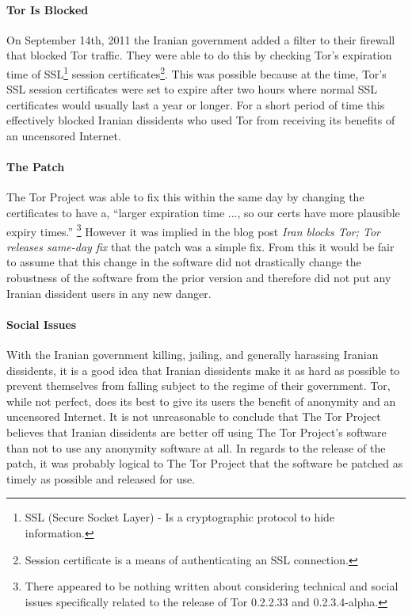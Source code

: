 \documentclass[11pt]{article}
\begin{document}
\begin{multicols}{2}
\paragraph{Tor Is Blocked}

On September 14th, 2011 the Iranian government added a filter to their firewall
that blocked Tor traffic. They were able to do this by checking Tor's expiration
time of SSL\footnote{SSL (Secure Socket Layer) - Is a cryptographic protocol to
hide information.} session certificates\footnote{Session certificate is a
means of authenticating an SSL connection.}. This was possible because at the
time, Tor's SSL session certificates were set to expire after two hours where normal SSL
certificates would usually last a year or longer. For a short period of time this
effectively blocked Iranian dissidents who used Tor from receiving its benefits
of an uncensored Internet.\cite{IranBlocksTorSameDayFix}

\paragraph{The Patch} 

The Tor Project was able to fix this within the same day by changing the
certificates to have a, ``larger expiration time ..., so our certs have more
plausible expiry times.''\cite{IranBlocksTorSameDayFix} \footnote{There appeared to be
nothing written about considering technical and social issues specifically
related to the release of Tor 0.2.2.33 and 0.2.3.4-alpha.}  However it was
implied in the blog post \textit{Iran blocks Tor; Tor releases same-day fix}
that the patch was a simple fix.\cite{IranBlocksTorSameDayFix} From this it
would be fair to assume that this change in the software did not drastically
change the robustness of the software from the prior version and therefore did
not put any Iranian dissident users in any new danger.

\paragraph{Social Issues}

With the Iranian government killing, jailing, and generally harassing Iranian
dissidents, it is a good idea that Iranian dissidents make it as hard as
possible to prevent themselves from falling subject to the regime of their
government.  Tor, while not perfect, does its best to give its users the benefit
of anonymity and an uncensored Internet. It is not unreasonable to conclude that
The Tor Project believes that Iranian dissidents are better off using The Tor
Project's software than not to use any anonymity software at all. In regards to
the release of the patch, it was probably logical to The Tor Project that the
software be patched as timely as possible and released for use.


\end{multicols}
\end{document}
